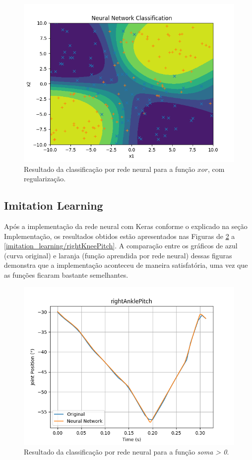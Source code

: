 \documentclass[conference]{IEEEtran}
\begin{document}
\begin{figure}[htbp]
\centering
\centerline{\includegraphics[scale=0.5]{imagens/xor/nn_classification_xor.png}}
\caption{Resultado da classificação por rede neural para a função $xor$, com regularização.}
\label{xor/nn_classification_xor}
\end{figure}

\subsection{Imitation Learning}
Após a implementação da rede neural com Keras conforme o explicado na seção Implementação, os resultados obtidos estão apresentados nas Figuras de \ref{imitation_learning/rightAnklePitch} a \ref{imitation_learning/rightKneePitch}. A comparação entre os gráficos de azul (curva original) e laranja (função aprendida por rede neural) dessas figuras demonstra que a implementação aconteceu de maneira satisfatória, uma vez que as funções ficaram bastante semelhantes.

\begin{figure}[htbp]
\centering
\centerline{\includegraphics[scale=0.5]{imagens/imitation_learning/rightAnklePitch.png}}
\caption{Resultado da classificação por rede neural para a função \textit{soma > 0}.}
\label{imitation_learning/rightAnklePitch}
\end{figure} 
\end{document}
